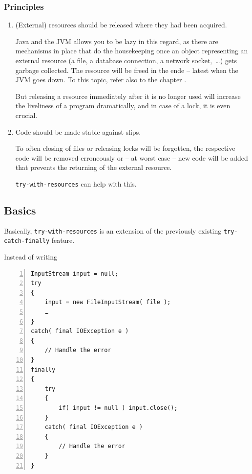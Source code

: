 \subsubsection{Principles}
\begin{enumerate}[label=P\arabic*.]
\item{(External) resources should be released where they had been acquired.

Java and the JVM allows you to be lazy in this regard, as there are mechanisms in place that do the housekeeping once an object representing an external resource (a file, a database connection, a network socket,~…) gets garbage collected. The resource will be freed in the ende – latest when the JVM goes down. To this topic, refer also to the chapter .

But releasing a resource immediately after it is no longer used will increase the liveliness of a program dramatically, and in case of a lock, it is even crucial.}

\item{Code should be made stable against slips.

To often closing of files or releasing locks will be forgotten, the respective code will be removed erroneously or – at worst case – new code will be added that prevents the returning of the external resource.

\verb#try-with-resources# can help with this.}
\end{enumerate}


\subsection{Basics}
Basically, \verb#try-with-resources# is an extension of the previously existing \verb#try-catch-finally#\autocite{ORACLE_DOC_LANGUAGE_SPECIFICATION:Try} feature.

Instead of writing
\begin{lstlisting}[numbers=left]
InputStream input = null;
try
{
    input = new FileInputStream( file );
    …
}
catch( final IOException e )
{
    // Handle the error
}
finally
{
    try
    {
        if( input != null ) input.close();
    }
    catch( final IOException e )
    {
        // Handle the error
    }
}
\end{lstlisting}


